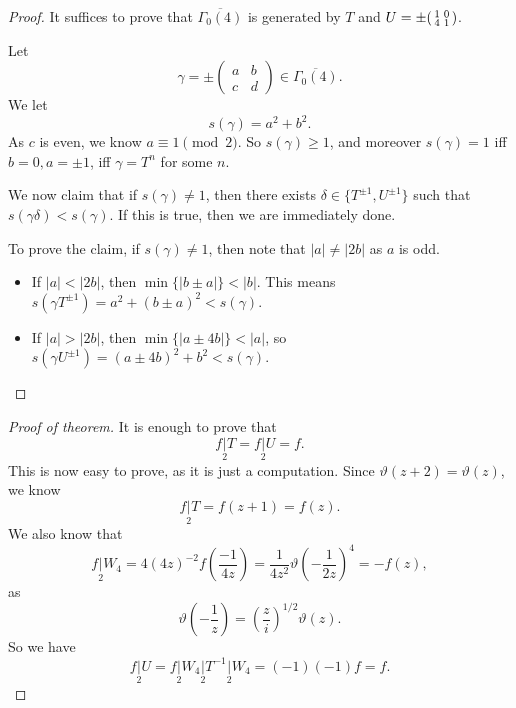\documentclass[a4paper]{article}
\begin{document}
\begin{proof}
  It suffices to prove that $\overline{\Gamma_0(4)}$ is generated by $T$ and $U = \pm \begin{psmallmatrix} 1 & 0\\ 4 & 1 \end{psmallmatrix}$.

  Let
  \[
    \gamma = \pm
    \begin{pmatrix}
      a & b\\
      c & d
    \end{pmatrix} \in \overline{\Gamma_0(4)}.
  \]
  We let
  \[
    s(\gamma) = a^2 + b^2.
  \]
  As $c$ is even, we know $a \equiv 1 \pmod 2$. So $s(\gamma) \geq 1$, and moreover $s(\gamma) = 1$ iff $b = 0, a = \pm 1$, iff $\gamma = T^n$ for some $n$.

  We now claim that if $s(\gamma) \not= 1$, then there exists $\delta \in \{T^{\pm 1}, U^{\pm 1}\}$ such that $s(\gamma\delta) < s(\gamma)$. If this is true, then we are immediately done.

  To prove the claim, if $s(\gamma) \not= 1$, then note that $|a| \not= |2b|$ as $a$ is odd.
  \begin{itemize}
    \item If $|a| < |2b|$, then $\min\{|b \pm a|\} < |b|$. This means $s(\gamma T^{\pm 1}) = a^2 + (b \pm a)^2 < s(\gamma)$.
    \item If $|a| > |2b|$, then $\min \{|a \pm 4b|\} < |a|$, so $s(\gamma U^{\pm 1}) = (a \pm 4b)^2 + b^2 < s(\gamma)$.
  \end{itemize}
\end{proof}

\begin{proof}[Proof of theorem]
  It is enough to prove that
  \[
    f\underset{2}{|}T = f\underset{2}{|} U = f.
  \]
  This is now easy to prove, as it is just a computation. Since $\vartheta(z + 2) = \vartheta(z)$, we know
  \[
    f\underset{2}{|} T = f(z + 1) = f(z).
  \]
  We also know that
  \[
    f\underset{2}{|} W_4 = 4 (4z)^{-2} f\left(\frac{-1}{4z}\right) = \frac{1}{4 z^2} \vartheta\left(-\frac{1}{2z}\right)^4 = - f(z),
  \]
  as
  \[
    \vartheta\left(-\frac{1}{z}\right) = \left(\frac{z}{i}\right)^{1/2} \vartheta(z).
  \]
  So we have
  \[
    f\underset{2}{|} U = f\underset{2}{|} W_4 \underset{2}{|} T^{-1} \underset{2}{|} W_4 = (-1)(-1)f = f.
  \]
\end{proof}
\end{document}
